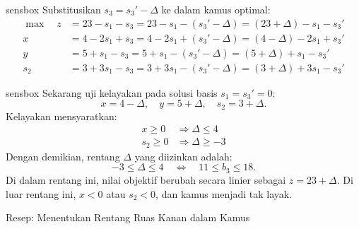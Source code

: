 \begin{steppanel}{sensbox}
Substitusikan \( s_3 = s_3' - \Delta \) ke dalam kamus optimal:
\[
\begin{aligned}
\max \quad
z &= 23 - s_1 - s_3 = 23 - s_1 - (s_3' - \Delta) = (23 + \Delta) - s_1 - s_3' \\
x &= 4 - 2s_1 + s_3 = 4 - 2s_1 + (s_3' - \Delta) = (4 - \Delta) - 2s_1 + s_3' \\
y &= 5 + s_1 - s_3 = 5 + s_1 - (s_3' - \Delta) = (5 + \Delta) + s_1 - s_3' \\
s_2 &= 3 + 3s_1 - s_3 = 3 + 3s_1 - (s_3' - \Delta) = (3 + \Delta) + 3s_1 - s_3'
\end{aligned}
\]
\end{steppanel}

\begin{steppanel}{sensbox}
Sekarang uji kelayakan pada solusi basis \( s_1 = s_3' = 0 \):
\[
x = 4 - \Delta, \quad
y = 5 + \Delta, \quad
s_2 = 3 + \Delta.
\]
Kelayakan mensyaratkan:
\[
\begin{aligned}
x \geq 0 &\Rightarrow \Delta \leq 4 \\
s_2 \geq 0 &\Rightarrow \Delta \geq -3
\end{aligned}
\]
Dengan demikian, rentang \( \Delta \) yang diizinkan adalah:
\[
\boxed{-3 \leq \Delta \leq 4}
\quad\Longleftrightarrow\quad
11 \leq b_3 \leq 18.
\]
Di dalam rentang ini, nilai objektif berubah secara linier sebagai \( z = 23 + \Delta \). Di luar rentang ini, \( x < 0 \) atau \( s_2 < 0 \), dan kamus menjadi tak layak.
\end{steppanel}

\begin{algocard}{Resep: Menentukan Rentang Ruas Kanan dalam Kamus}
\end{algocard}

